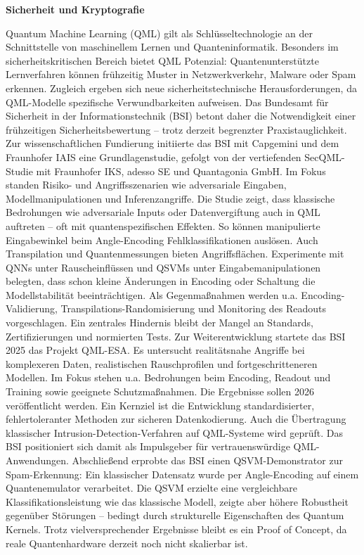\vspace{1.2em}
\noindent\textbf{Sicherheit und Kryptografie}

\noindent
Quantum Machine Learning (QML) gilt als Schlüsseltechnologie an der Schnittstelle von maschinellem Lernen und Quanteninformatik. Besonders im sicherheitskritischen Bereich bietet QML Potenzial: Quantenunterstützte Lernverfahren können frühzeitig Muster in Netzwerkverkehr, Malware oder Spam erkennen. Zugleich ergeben sich neue sicherheitstechnische Herausforderungen, da QML-Modelle spezifische Verwundbarkeiten aufweisen. Das Bundesamt für Sicherheit in der Informationstechnik (BSI) betont daher die Notwendigkeit einer frühzeitigen Sicherheitsbewertung – trotz derzeit begrenzter Praxistauglichkeit.
Zur wissenschaftlichen Fundierung initiierte das BSI mit Capgemini und dem Fraunhofer IAIS eine Grundlagenstudie, gefolgt von der vertiefenden SecQML-Studie mit Fraunhofer IKS, adesso SE und Quantagonia GmbH. Im Fokus standen Risiko- und Angriffsszenarien wie adversariale Eingaben, Modellmanipulationen und Inferenzangriffe.
Die Studie zeigt, dass klassische Bedrohungen wie adversariale Inputs oder Datenvergiftung auch in QML auftreten – oft mit quantenspezifischen Effekten. So können manipulierte Eingabewinkel beim Angle-Encoding Fehlklassifikationen auslösen. Auch Transpilation und Quantenmessungen bieten Angriffsflächen.
Experimente mit QNNs unter Rauscheinflüssen und QSVMs unter Eingabemanipulationen belegten, dass schon kleine Änderungen in Encoding oder Schaltung die Modellstabilität beeinträchtigen. Als Gegenmaßnahmen werden u.a. Encoding-Validierung, Transpilations-Randomisierung und Monitoring des Readouts vorgeschlagen. Ein zentrales Hindernis bleibt der Mangel an Standards, Zertifizierungen und normierten Tests.
Zur Weiterentwicklung startete das BSI 2025 das Projekt QML-ESA. Es untersucht realitätsnahe Angriffe bei komplexeren Daten, realistischen Rauschprofilen und fortgeschritteneren Modellen. Im Fokus stehen u.a. Bedrohungen beim Encoding, Readout und Training sowie geeignete Schutzmaßnahmen. Die Ergebnisse sollen 2026 veröffentlicht werden.
Ein Kernziel ist die Entwicklung standardisierter, fehlertoleranter Methoden zur sicheren Datenkodierung. Auch die Übertragung klassischer Intrusion-Detection-Verfahren auf QML-Systeme wird geprüft. Das BSI positioniert sich damit als Impulsgeber für vertrauenswürdige QML-Anwendungen.
Abschließend erprobte das BSI einen QSVM-Demonstrator zur Spam-Erkennung: Ein klassischer Datensatz wurde per Angle-Encoding auf einem Quantenemulator verarbeitet. Die QSVM erzielte eine vergleichbare Klassifikationsleistung wie das klassische Modell, zeigte aber höhere Robustheit gegenüber Störungen – bedingt durch strukturelle Eigenschaften des Quantum Kernels. Trotz vielversprechender Ergebnisse bleibt es ein Proof of Concept, da reale Quantenhardware derzeit noch nicht skalierbar ist. \cite{bsiQuantumMachineLearning2025}
\vspace{1em}

